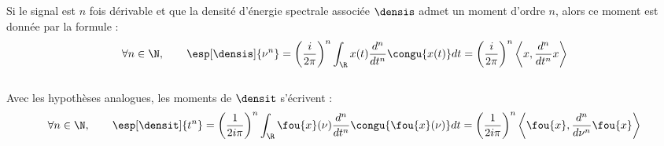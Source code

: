 \begin{proposition} \label{prop:integ_trick}
	Si le signal est $n$ fois dérivable et que la densité d’énergie spectrale associée $\densis$ admet un moment d'ordre $n$, alors ce moment est donnée par la formule :
	\begin{equation}\label{eq:moment_f}
		\forall n\in\N,\qquad \esp[\densis]{\nu^n} = \left(\frac{i}{2 \pi}\right)^n  \int_\R x(t) \frac{d^n}{dt^n} \congu{x(t)} dt = \left(\frac{i}{2 \pi}\right)^n  \left\langle x, \frac{d^n}{dt^n}x\right\rangle
	\end{equation}
	\\
	Avec les hypothèses analogues, les moments de $\densit$ s'écrivent :
	\begin{equation}\label{eq:moment_t}
		\forall n\in\N,\qquad \esp[\densit]{t^n} = \left(\frac{1}{2i \pi}\right)^n  \int_\R \fou{x}(\nu) \frac{d^n}{dt^n} \congu{\fou{x}(\nu)} dt = \left(\frac{1}{2i \pi}\right)^n  \left\langle \fou{x}, \frac{d^n}{d\nu^n}\fou{x}\right\rangle
	\end{equation}
\end{proposition}


